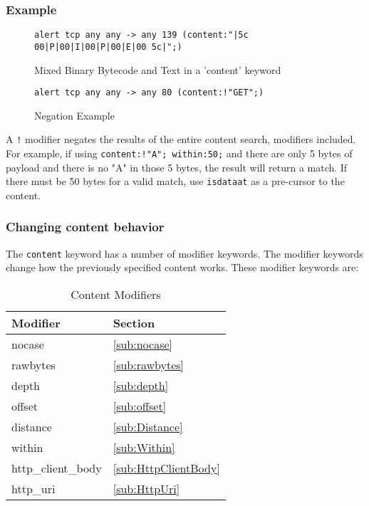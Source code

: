 \documentclass[english]{report}
\newenvironment{note}{
\samepage
    \vspace{10pt}{\textsf{
        {\hspace{7pt}\Huge{$\triangle$\hspace{-12.5pt}{\Large{$^!$}}}}\hspace{5pt}
        {\Large{NOTE}}
    }
    }
   \begin{center}
    \par\vspace{-17pt}

    \begin{lrbox}{\savepar}
    \begin{minipage}[r]{6in}
}
{
    \end{minipage}
    \end{lrbox}
    \fbox{
        \usebox{
            \savepar
	}
    }
    \par\vskip10pt
    \end{center}
}
\newenvironment{note}{
        \begin{rawhtml}
        <p><table border="1"><tr><td><b>
        Note:&nbsp;&nbsp;</b>
        \end{rawhtml}
}{
        \begin{rawhtml}
        </b></td></tr></table></p>
        \end{rawhtml}
}
\begin{document}
\subsubsection{Example}

\begin{figure}[!hbpt]
\begin{verbatim}
alert tcp any any -> any 139 (content:"|5c 00|P|00|I|00|P|00|E|00 5c|";)
\end{verbatim}
\caption{\label{mixed content example}Mixed Binary Bytecode and Text in a 'content' keyword}
\end{figure}

\begin{figure}[!hbpt]
\begin{verbatim}
alert tcp any any -> any 80 (content:!"GET";)
\end{verbatim}
\caption{\label{content negation example}Negation Example}
\end{figure}

\begin{note}
A \texttt{!} modifier negates the results of the entire content search,
modifiers included.  For example, if using \texttt{content:!"A"; within:50;}
and there are only 5 bytes of payload and there is no "A" in those 5 bytes,
the result will return a match.  If there must be 50 bytes for a valid
match, use \texttt{isdataat} as a pre-cursor to the content.
\end{note}

\subsubsection{Changing content behavior}

The \texttt{content} keyword has a number of modifier keywords.  The modifier keywords change 
how the previously specified content works.  These modifier keywords are:

\begin{center}
\begin{longtable}{|p{1in}|p{1in}|}
\caption{Content Modifiers \label{Content Modifiers}} \\
\hline 
Modifier & Section \\
\hline
\hline 
nocase & \ref{sub:nocase} \\
\hline
rawbytes & \ref{sub:rawbytes} \\
\hline
depth & \ref{sub:depth} \\
\hline 
offset & \ref{sub:offset} \\
\hline
distance & \ref{sub:Distance} \\
\hline 
within & \ref{sub:Within} \\
\hline
http\_client\_body & \ref{sub:HttpClientBody} \\
\hline 
http\_uri & \ref{sub:HttpUri} \\
\hline
\end{longtable}
\end{center}
\end{document}
